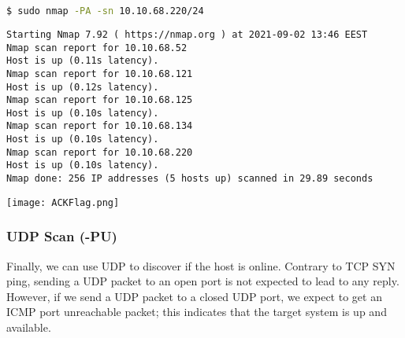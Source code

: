 \documentclass[11pt]{article}
\newenvironment{commandbox}[1][]{
    \begin{tcolorbox}[
        colback=kalibackground,
        colframe=commandcolor,
        fonttitle=\bfseries\color{white},
        title=#1,
        breakable=true
    ]
}{
    \end{tcolorbox}
}
\begin{document}
\begin{commandbox}[TCP ACK Scan (-PA)]
\begin{lstlisting}[language=bash, style=bash, basicstyle=\small\ttfamily\color{warningcolor}]
$ sudo nmap -PA -sn 10.10.68.220/24
\end{lstlisting}
\begin{lstlisting}[basicstyle=\small\ttfamily\color{kalitext}]
Starting Nmap 7.92 ( https://nmap.org ) at 2021-09-02 13:46 EEST
Nmap scan report for 10.10.68.52
Host is up (0.11s latency).
Nmap scan report for 10.10.68.121
Host is up (0.12s latency).
Nmap scan report for 10.10.68.125
Host is up (0.10s latency).
Nmap scan report for 10.10.68.134
Host is up (0.10s latency).
Nmap scan report for 10.10.68.220
Host is up (0.10s latency).
Nmap done: 256 IP addresses (5 hosts up) scanned in 29.89 seconds
\end{lstlisting}
\end{commandbox}
\begin{center}
    \texttt{[image: ACKFlag.png]}
    \end{center}
\subsubsection{UDP Scan (-PU)}

Finally, we can use UDP to discover if the host is online. Contrary to TCP SYN ping, sending a UDP packet to an open port is not expected to lead to any reply. However, if we send a UDP packet to a closed UDP port, we expect to get an ICMP port unreachable packet; this indicates that the target system is up and available.
\end{document}
